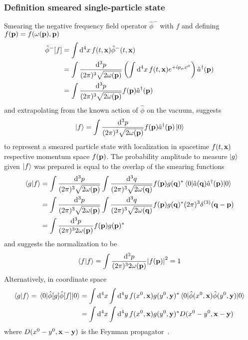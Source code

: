 \subsubsection{Definition smeared single-particle state}

Smearing the negative frequency field operator $\hat\phi^-$  with $f$ and defining $f(\vb{p})=f(\omega(\vb{p}),\vb{p})$
\begin{align}
	\hat\phi^-[f]
	&=
	\int\dd[4]{x}
	f(t,\vb{x})
	\hat\phi^-(t,\vb{x})
	\\
	&=
	\int\frac{\dd[3]{p}}{(2\pi)^3\sqrt{2\omega(\vb{p})}}
	\left(
		\int\dd[4]{x}
		f(t,\vb{x})
		e^{+ip_\mu x^\mu}
	\right)
	\hat{a}^\dagger(\vb{p})
	\\
	&=
	\int\frac{\dd[3]{p}}{(2\pi)^3\sqrt{2\omega(\vb{p})}}
	f(\vb{p})
	\hat{a}^\dagger(\vb{p})
\end{align}
and extrapolating from the known action of $\hat\phi$ on the vacuum, suggests
\begin{equation}
	\ket{f}
	=
	\int\frac{\dd[3]{p}}{(2\pi)^3\sqrt{2\omega(\vb{p})}}
	f(\vb{p})
	\hat{a}^\dagger(\vb{p})
	\ket{0}
\end{equation}
to represent a smeared particle state with localization in spacetime $f(t,\vb{x})$ respective momentum space $f(\vb{p})$.
The probability amplitude to measure $\ket{g}$ given $\ket{f}$ was prepared is equal to the overlap of the smearing functions
\begin{equation}
	\begin{split}
		\bra{g}\ket{f}
		&=
		\int\frac{\dd[3]{p}}{(2\pi)^3\sqrt{2\omega(\vb{p})}}
		\int\frac{\dd[3]{q}}{(2\pi)^3\sqrt{2\omega(\vb{q})}}
		f(\vb{p})g(\vb{q})^*
		\expval{\hat{a}(\vb{q})\hat{a}^\dagger(\vb{p})}{0}
		\\
		&=
		\int\frac{\dd[3]{p}}{(2\pi)^3\sqrt{2\omega(\vb{p})}}
		\int\frac{\dd[3]{q}}{(2\pi)^3\sqrt{2\omega(\vb{q})}}
		f(\vb{p})g(\vb{q})^*
		(2\pi)^3\delta^{(3)}(\vb{q}-\vb{p})
		\\
		&=
		\int\frac{\dd[3]{p}}{(2\pi)^32\omega(\vb{p})}
		f(\vb{p})g(\vb{p})^*
	\end{split}
\end{equation}
and suggests the normalization to be
\begin{equation}
	\bra{f}\ket{f}
	=
	\int\frac{\dd[3]{p}}{(2\pi)^32\omega(\vb{p})}
	\abs{f(\vb{p})}^2
	=
	1
\end{equation}
Alternatively, in coordinate space
\begin{equation}
	\begin{split}
		\bra{g}\ket{f}
		=
		\expval{\hat\phi[g]\hat\phi[f]}{0}
		&=
		\int\dd[4]{x}
		\int\dd[4]{y}
		f(x^0,\vb{x})g(y^0,\vb{y})^*
		\expval{\hat\phi(x^0,\vb{x})\hat\phi(y^0,\vb{y})}{0}
		\\
		&=
		\int\dd[4]{x}
		\int\dd[4]{y}
		f(x^0,\vb{x})g(y^0,\vb{y})^*
		D(x^0-y^0,\vb{x}-\vb{y})
	\end{split}
\end{equation}
where $D(x^0-y^0,\vb{x}-\vb{y})$ is the Feynman propagator~\cite[p.~27]{Peskin1995}.

